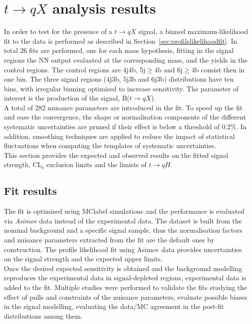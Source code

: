 \chapter{$t\to qX$ analysis results}
\label{chapter:tqXresults}

In order to test for the presence of a $t\to qX$ signal, a binned maximum-likelihood fit to the data is performed as described in Section~\ref{sec:profilelikelihoodfit}. In total 26 fits are performed, one for each mass hypothesis, fitting in the signal regions the NN output evaluated at the corresponding mass, and the yields in the control regions. The control regions are 4j4b, 5j$\geq$4b and 6j$\geq$4b consist then in one bin. The three signal regions (4j3b, 5j3b and 6j3b) distributions have ten bins, with irregular binning optimised to increase sensitivity. The parameter of interest is the production of the signal, B($t\to qX$).\\

A total of 282 nuisance parameters are introduced in the fit. To speed up the fit and ease the convergence, the shape or normalisation components of the different systematic uncertainties are pruned if their effect is below a threshold of 0.2\%. In addition, smoothing techniques are applied to reduce the impact of statistical fluctuations when computing the templates of systematic uncertainties.\\

This section provides the expected and observed results on the fitted signal strength, CL$_{\text{s}}$ exclusion limits and the limists of $t\to qH$.

\section{Fit results}

The fit is optimised using \acrshort{MClabel} simulations and the performance is evaluated via \textit{Asimov} data instead of the experimental data. The dataset is built from the nominal background and a specific signal sample, thus the normalisation factors and nuisance parameters extracted from the fit are the default ones by construction. The profile likelihood fit using Asimov data provides uncertainties on the signal strength and the expected upper limits.\\

Once the desired expected sensitivity is obtained and the background modelling reproduces the experimental data in signal-depleted regions, experimental data is added to the fit. Multiple studies were performed to validate the fits studying the effect of pulls and constraints of the nuisance parameters, evaluate possible biases in the signal modelling, evaluating the data/MC agreement in the post-fit distributions among them.\\


